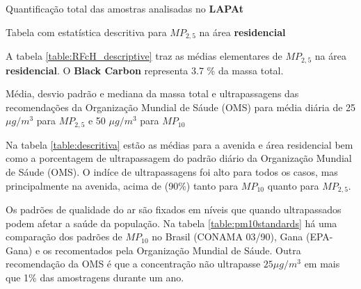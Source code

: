 \begin{table}[H]
  \centering
  \begin{scriptsize}
  
  \end{scriptsize}
  \caption{Quantificação total das amostras analisadas no \textbf{LAPAt}}
\end{table}

%    

\begin{table}[H]
  \centering
  \begin{scriptsize}
    
  \end{scriptsize}
  \caption{Tabela com estatística descritiva para $MP_{2,5}$ na área \textbf{residencial}
           \label{table:RFcH_descriptive}}
\end{table}

A tabela \ref{table:RFcH_descriptive} traz as médias elementares de $MP_{2,5}$ na área 
\textbf{residencial}.
O \textbf{Black Carbon} representa 3.7 \% da massa total.



Média, desvio padrão e mediana da massa total e ultrapassagens das 
           recomendações da Organização Mundial de Sáude (OMS) para média diária de 
           25 $\mu g/m^3$ para $MP_{2,5}$ e 50 $\mu g/m^3$ para $MP_{10}$


Na tabela \ref{table:descritiva} estão as médias para a avenida e área residencial
bem como a porcentagem de ultrapassagem do padrão diário da 
Organização Mundial de Sáude (OMS).
O indíce de ultrapassagens foi alto para todos os casos, mas principalmente na avenida,
acima de (90\%) tanto para $MP_{10}$ quanto para $MP_{2,5}$.

Os padrões de qualidade do ar são fixados em níveis que quando ultrapassados 
podem afetar a saúde da população. 
Na tabela \ref{table:pm10standards} há uma comparação dos padrões de $MP_{10}$ 
no Brasil (CONAMA 03/90), Gana (EPA-Gana) e os recomentados pela Organização
Mundial de Sáude.
Outra recomendação da OMS é que a concentração não ultrapasse $25 \mu g/m^3$ 
em mais que 1\% das amostragens durante um ano. 

